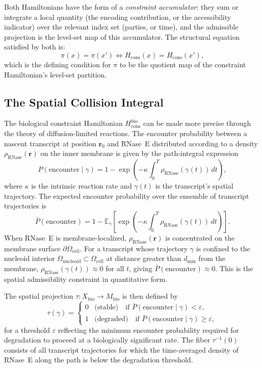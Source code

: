 \documentclass[12pt, a4paper]{article}
\theoremstyle{essaystyle}
\begin{document}
Both Hamiltonians have the form of a \emph{constraint accumulator}: they sum or
integrate a local quantity (the encoding contribution, or the accessibility indicator)
over the relevant index set (parties, or time), and the admissible projection is the
level-set map of this accumulator. The structural equation satisfied by both is:
\[
\pi(x) = \pi(x') \iff H_{\mathrm{cons}}(x) = H_{\mathrm{cons}}(x'),
\]
which is the defining condition for $\pi$ to be the quotient map of the constraint
Hamiltonian's level-set partition.

\subsection{The Spatial Collision Integral}

The biological constraint Hamiltonian $H_{\mathrm{cons}}^{\mathrm{bio}}$ can be made
more precise through the theory of diffusion-limited reactions. The encounter probability
between a nascent transcript at position $\mathbf{r}_0$ and RNase~E distributed
according to a density $\rho_{\mathrm{RNase}}(\mathbf{r})$ on the inner membrane is
given by the path-integral expression
\[
P(\text{encounter} \mid \gamma)
= 1 - \exp\!\left(
-\kappa \int_0^T \rho_{\mathrm{RNase}}(\gamma(t))\, dt
\right),
\]
where $\kappa$ is the intrinsic reaction rate and $\gamma(t)$ is the transcript's
spatial trajectory. The expected encounter probability over the ensemble of transcript
trajectories is
\[
\bar{P}(\text{encounter})
= 1 - \mathbb{E}_\gamma\!\left[\exp\!\left(
-\kappa \int_0^T \rho_{\mathrm{RNase}}(\gamma(t))\, dt
\right)\right].
\]
When RNase~E is membrane-localized, $\rho_{\mathrm{RNase}}(\mathbf{r})$ is concentrated
on the membrane surface $\partial\Omega_{\mathrm{cell}}$. For a transcript whose
trajectory $\gamma$ is confined to the nucleoid interior
$\Omega_{\mathrm{nucleoid}} \subset \Omega_{\mathrm{cell}}$ at distance greater than
$d_{\min}$ from the membrane, $\rho_{\mathrm{RNase}}(\gamma(t)) \approx 0$ for all $t$,
giving $\bar{P}(\text{encounter}) \approx 0$. This is the spatial admissibility
constraint in quantitative form.

The spatial projection $\tau : X_{\mathrm{bio}} \to M_{\mathrm{bio}}$ is then defined
by
\[
\tau(\gamma) =
\begin{cases}
0 & \text{(stable)} \quad \text{if } \bar{P}(\text{encounter} \mid \gamma) < \varepsilon, \\
1 & \text{(degraded)} \quad \text{if } \bar{P}(\text{encounter} \mid \gamma) \geq \varepsilon,
\end{cases}
\]
for a threshold $\varepsilon$ reflecting the minimum encounter probability required
for degradation to proceed at a biologically significant rate. The fiber
$\tau^{-1}(0)$ consists of all transcript trajectories for which the time-averaged
density of RNase~E along the path is below the degradation threshold.
\end{document}
